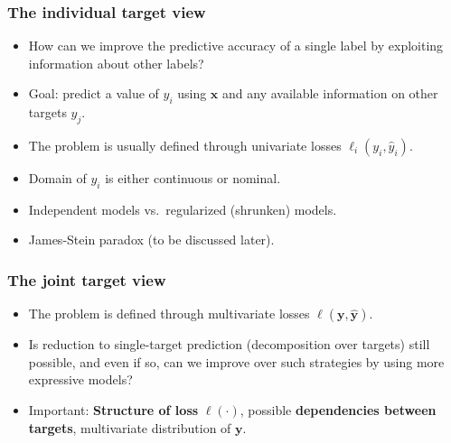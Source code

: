 \documentclass[]{beamer}
\newcommand{\bx}{\boldsymbol{x}}
\newcommand{\by}{\boldsymbol{y}}
\renewcommand{\emph}[1]{\textbf{\color{putblue}#1}}
\begin{document}
\begin{frame}
\frametitle{The individual target view}

\begin{itemize} 
\item How can we improve the predictive accuracy of a single label by exploiting information about other labels?
\item Goal: predict a value of $y_i$ using $\bx$ and any available information on other targets $y_j$.
\item The problem is usually defined through univariate losses $\ell_i(y_i, \hat{y}_i)$.
\item  Domain of $y_i$ is either continuous or nominal.
\item  Independent models vs.\ regularized (shrunken) models.
\item James-Stein paradox (to be discussed later).

\end{itemize}

\end{frame}



\begin{frame}
\frametitle{The joint target view}

\begin{itemize}
\item The problem is defined through multivariate losses $\ell(\by, \hat{\by})$.
\item Is reduction to single-target prediction (decomposition over targets) still possible, and even if so, can we improve over such strategies by using more expressive models?
\item Important: \emph{Structure of loss} $\ell(\cdot)$, possible \emph{dependencies between targets}, multivariate distribution of $\by$.


\end{itemize}
\end{frame}
\end{document}
